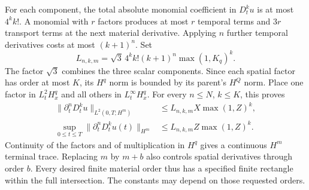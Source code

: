 For each component, the total absolute monomial coefficient in
\(D_t^ku\) is at most \(4^k k!\). A monomial with \(r\) factors
produces at most \(r\) temporal terms and \(3r\) transport terms
at the next material derivative. Applying \(n\) further temporal
derivatives costs at most \((k+1)^n\). Set
\[
 L_{n,k,m}=\sqrt3\,4^k k!(k+1)^n\max(1,K_q)^k.
\]
The factor \(\sqrt3\) combines the three scalar components. Since each
spatial factor has order at most \(K\), its \(H^q\) norm is bounded
by its parent's \(H^Q\) norm. Place one factor in \(L^2_tH^q_x\)
and all others in \(L^\infty_tH^q_x\). For every \(n\le N\),
\(k\le K\), this proves
\begin{equation}
\begin{aligned}
 \|\partial_t^nD_t^ku\|_{L^2(0,T;H^m)}
 &\le L_{n,k,m}X\max(1,Z)^k,\\
 \sup_{0\le t\le T}\|\partial_t^nD_t^ku(t)\|_{H^m}
 &\le L_{n,k,m}Z\max(1,Z)^k.
\end{aligned}
\label{r:eq:material-target-bounds}
\end{equation}
Continuity of the factors and of multiplication in \(H^q\) gives a
continuous \(H^m\) terminal trace. Replacing \(m\) by \(m+b\)
also controls spatial derivatives through order \(b\).
Every desired finite material order thus has a specified finite
rectangle within the full intersection. The constants may depend on
those requested orders.
